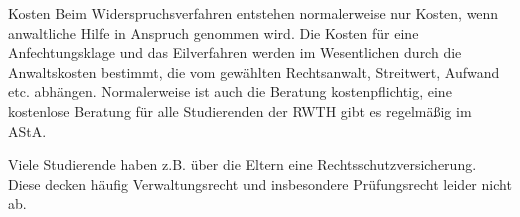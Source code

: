 \begin{artikel}{Kosten}
Beim Widerspruchsverfahren entstehen normalerweise nur Kosten, wenn anwaltliche Hilfe in Anspruch genommen wird. Die Kosten für eine Anfechtungsklage und das Eilverfahren werden im Wesentlichen durch die Anwaltskosten bestimmt, die vom gewählten Rechtsanwalt, Streitwert, Aufwand etc. abhängen. Normalerweise ist auch die Beratung kostenpflichtig, eine kostenlose Beratung für alle Studierenden der RWTH gibt es regelmäßig im AStA.

Viele Studierende haben z.B. über die Eltern eine Rechtsschutzversicherung. Diese decken häufig Verwaltungsrecht und insbesondere Prüfungsrecht leider nicht ab.
\end{artikel}

